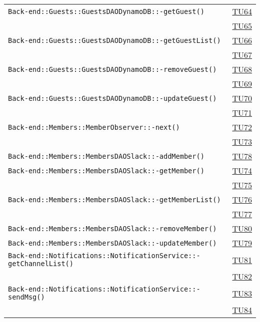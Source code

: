 \begin{longtable}{|>{\centering}m{12cm}|m{1cm}<{\centering}|}
\texttt{Back-end::Guests::GuestsDAODynamoDB::-\linebreak getGuest()} & \hyperlink{TU64}{TU64}\\ & \hyperlink{TU65}{TU65}\\ \hline
\texttt{Back-end::Guests::GuestsDAODynamoDB::-\linebreak getGuestList()} & \hyperlink{TU66}{TU66}\\ & \hyperlink{TU67}{TU67}\\ \hline
\texttt{Back-end::Guests::GuestsDAODynamoDB::-\linebreak removeGuest()} & \hyperlink{TU68}{TU68}\\ & \hyperlink{TU69}{TU69}\\ \hline
\texttt{Back-end::Guests::GuestsDAODynamoDB::-\linebreak updateGuest()} & \hyperlink{TU70}{TU70}\\ & \hyperlink{TU71}{TU71}\\ \hline
\texttt{Back-end::Members::MemberObserver::-\linebreak next()} & \hyperlink{TU72}{TU72}\\ & \hyperlink{TU73}{TU73}\\ \hline
\texttt{Back-end::Members::MembersDAOSlack::-\linebreak addMember()} & \hyperlink{TU78}{TU78}\\ \hline
\texttt{Back-end::Members::MembersDAOSlack::-\linebreak getMember()} & \hyperlink{TU74}{TU74}\\ & \hyperlink{TU75}{TU75}\\ \hline
\texttt{Back-end::Members::MembersDAOSlack::-\linebreak getMemberList()} & \hyperlink{TU76}{TU76}\\ & \hyperlink{TU77}{TU77}\\ \hline
\texttt{Back-end::Members::MembersDAOSlack::-\linebreak removeMember()} & \hyperlink{TU80}{TU80}\\ \hline
\texttt{Back-end::Members::MembersDAOSlack::-\linebreak updateMember()} & \hyperlink{TU79}{TU79}\\ \hline
\texttt{Back-end::Notifications::NotificationService::-\linebreak getChannelList()} & \hyperlink{TU81}{TU81}\\ & \hyperlink{TU82}{TU82}\\ \hline
\texttt{Back-end::Notifications::NotificationService::-\linebreak sendMsg()} & \hyperlink{TU83}{TU83}\\ & \hyperlink{TU84}{TU84}\\ \hline

\end{longtable}
